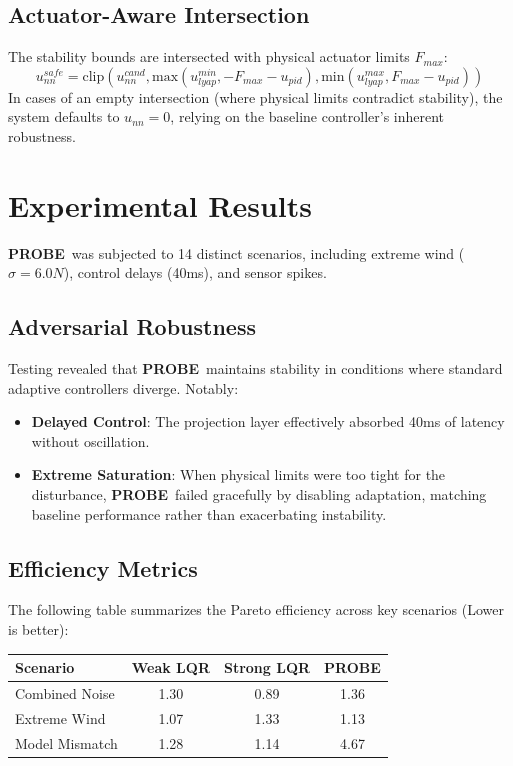 \documentclass[11pt,a4paper]{article}
\newcommand{\probe}{\textbf{PROBE}}
\begin{document}
\subsection{Actuator-Aware Intersection}
The stability bounds are intersected with physical actuator limits $F_{max}$:
\begin{equation}
    u_{nn}^{safe} = \text{clip}(u_{nn}^{cand}, \text{max}(u_{lyap}^{min}, -F_{max} - u_{pid}), \text{min}(u_{lyap}^{max}, F_{max} - u_{pid}))
\end{equation}
In cases of an empty intersection (where physical limits contradict stability), the system defaults to $u_{nn} = 0$, relying on the baseline controller's inherent robustness.

\section{Experimental Results}
\probe\ was subjected to 14 distinct scenarios, including extreme wind ($\sigma=6.0N$), control delays (40ms), and sensor spikes.

\subsection{Adversarial Robustness}
Testing revealed that \probe\ maintains stability in conditions where standard adaptive controllers diverge. Notably:
\begin{itemize}
    \item \textbf{Delayed Control}: The projection layer effectively absorbed 40ms of latency without oscillation.
    \item \textbf{Extreme Saturation}: When physical limits were too tight for the disturbance, \probe\ failed gracefully by disabling adaptation, matching baseline performance rather than exacerbating instability.
\end{itemize}

\subsection{Efficiency Metrics}
The following table summarizes the Pareto efficiency across key scenarios (Lower is better):

\begin{center}
\begin{tabular}{lccc}
\toprule
Scenario & Weak LQR & Strong LQR & \probe \\
\midrule
Combined Noise & 1.30 & 0.89 & 1.36 \\
Extreme Wind & 1.07 & 1.33 & 1.13 \\
Model Mismatch & 1.28 & 1.14 & 4.67 \\
\bottomrule
\end{tabular}
\end{center}
\end{document}
